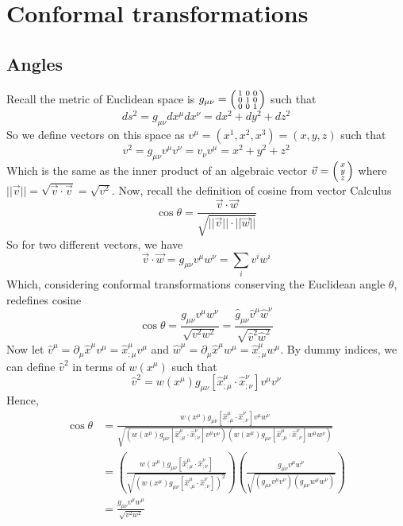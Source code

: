 \documentclass{article}
\begin{document}
	\section{Conformal transformations}
		\subsection{Angles}
			Recall the metric of Euclidean space is $g_{\mu\nu} = \begin{psmallmatrix}
			1 & 0 & 0 \\ 0 & 1 & 0 \\ 0 & 0 & 1
			\end{psmallmatrix}$ such that
			$$ ds^2 = g_{\mu\nu}dx^\mu dx^\nu = dx^2 + dy^2 +dz^2$$
			So we define vectors on this space as $v^\mu = (x^1, x^2, x^3) = (x,y,z)$ such that
			$$ v^2 = g_{\mu\nu} v^\mu v^\nu = v_\nu v^\mu = x^2 +y^2 + z^2$$
			Which is the same as the inner product of an algebraic vector $\vec{v} = \begin{psmallmatrix}
				x\\y\\z
			\end{psmallmatrix}$ where $||\vec{v} || = \sqrt{\vec{v} \cdot \vec{v}} = \sqrt{v^2}$. Now, recall the definition of cosine from vector Calculus
			$$ \cos\theta = \frac{\vec{v}\cdot{\vec{w}}}{\sqrt{||\vec{v} ||\cdot||\vec{w} ||}}$$
			So for two different vectors, we have
			$$ \vec{v}\cdot\vec{w} = g_{\mu\nu} v^\mu w^\nu = \sum_i v^i w^i$$
			Which, considering conformal transformations conserving the Euclidean angle $\theta$, redefines cosine
			$$ \cos\theta = \frac{g_{\mu\nu} v^\mu w^\nu}{\sqrt{v^2 w^2}} =\frac{\hat g_{\mu\nu} \hat v^\mu \hat w^\nu}{\sqrt{\hat v^2 \hat w^2}} $$
			Now let $\hat{v}^\mu = \partial_\mu \hat{x}^\mu v^\mu = \hat{x}^\mu_{;\mu} v^\mu$ and $\hat{w}^\mu = \partial_\mu \hat{x}^\mu w^\mu = \hat{x}^\mu_{;\mu} w^\mu$. By dummy indices, we can define $\hat v^2$ in terms of $w\left(x^\mu\right)$ such that
			$$ \hat v^2 = w\left(x^\mu\right) g_{\mu\nu} \left[ \hat{x}^\mu_{;\mu} \cdot \hat{x}^\nu_{;\nu} \right] v^\mu v^\nu$$
			Hence,
			\begin{align*}
				\cos \theta &= \frac{w\left(x^\mu\right) g_{\mu\nu} \left[ \hat{x}^\mu_{;\mu} \cdot \hat{x}^\nu_{;\nu} \right] v^\mu w^\nu}{\sqrt{\left( w\left(x^\mu\right) g_{\mu\nu} \left[ \hat{x}^\mu_{;\mu} \cdot \hat{x}^\nu_{;\nu} \right] v^\mu v^\nu\right)\left( w\left(x^\mu\right) g_{\mu\nu} \left[ \hat{x}^\mu_{;\mu} \cdot \hat{x}^\nu_{;\nu} \right] w^\mu w^\nu\right)}} \\
				&= \left( \frac{w\left(x^\mu\right) g_{\mu\nu} \left[ \hat{x}^\mu_{;\mu} \cdot \hat{x}^\nu_{;\nu} \right]}{\sqrt{\left( w\left(x^\mu\right) g_{\mu\nu} \left[ \hat{x}^\mu_{;\mu} \cdot \hat{x}^\nu_{;\nu} \right]\right)^2}} \right)\left( \frac{g_{\mu\nu} v^\mu w^\nu}{\sqrt{\left( g_{\mu\nu} v^\mu v^\nu\right) \left( g_{\mu\nu} w^\mu w^\nu \right)}}\right) \\
				&= \frac{g_{\mu\nu} v^\mu w^\mu}{\sqrt{v^2 w^2}}
			\end{align*}
\end{document}
